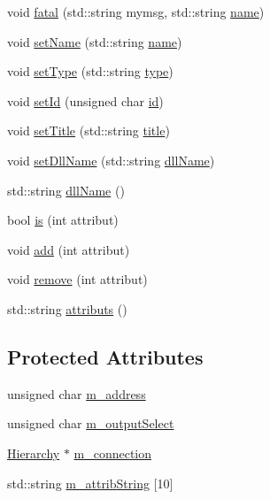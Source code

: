 \begin{DoxyCompactItemize}
void \hyperlink{classObject_ae62acd3d09f716220f75f252dc38bc9a}{fatal} (std\+::string mymsg, std\+::string \hyperlink{classObject_a300f4c05dd468c7bb8b3c968868443c1}{name})
\item 
void \hyperlink{classObject_ae30fea75683c2d149b6b6d17c09ecd0c}{set\+Name} (std\+::string \hyperlink{classObject_a300f4c05dd468c7bb8b3c968868443c1}{name})
\item 
void \hyperlink{classObject_aae534cc9d982bcb9b99fd505f2e103a5}{set\+Type} (std\+::string \hyperlink{classObject_a84f99f70f144a83e1582d1d0f84e4e62}{type})
\item 
void \hyperlink{classObject_a398fe08cba594a0ce6891d59fe4f159f}{set\+Id} (unsigned char \hyperlink{classObject_af99145335cc61ff6e2798ea17db009d2}{id})
\item 
void \hyperlink{classObject_a89557dbbad5bcaa02652f5d7fa35d20f}{set\+Title} (std\+::string \hyperlink{classObject_a73a0f1a41828fdd8303dd662446fb6c3}{title})
\item 
void \hyperlink{classObject_a870c5af919958c2136623b2d7816d123}{set\+Dll\+Name} (std\+::string \hyperlink{classObject_a2e3947f2870094c332d7454117f3ec63}{dll\+Name})
\item 
std\+::string \hyperlink{classObject_a2e3947f2870094c332d7454117f3ec63}{dll\+Name} ()
\item 
bool \hyperlink{classAttrib_a704f26af560909ad22065083bb7d4c34}{is} (int attribut)
\item 
void \hyperlink{classAttrib_a235f773af19c900264a190b00a3b4ad7}{add} (int attribut)
\item 
void \hyperlink{classAttrib_a7d4ef7e32d93cb287792b87b857e79f3}{remove} (int attribut)
\item 
std\+::string \hyperlink{classAttrib_aee7bbf16b144887f196e1341b24f8a26}{attributs} ()
\end{DoxyCompactItemize}
\subsection*{Protected Attributes}
\begin{DoxyCompactItemize}
\item 
unsigned char \hyperlink{classSpecsInterface_a4064da5ca6e0a172363967c4acc0b365}{m\+\_\+address}
\item 
unsigned char \hyperlink{classSpecsInterface_a660cb4112ce1c071f277cb6ec115b411}{m\+\_\+output\+Select}
\item 
\hyperlink{classHierarchy}{Hierarchy} $\ast$ \hyperlink{classElement_abe3de7a5dbbc9a6dd2d7e012e5fdb266}{m\+\_\+connection}
\item 
std\+::string \hyperlink{classAttrib_a3414521d7a82476e874b25a5407b5e63}{m\+\_\+attrib\+String} \mbox{[}10\mbox{]}
\end{DoxyCompactItemize}
